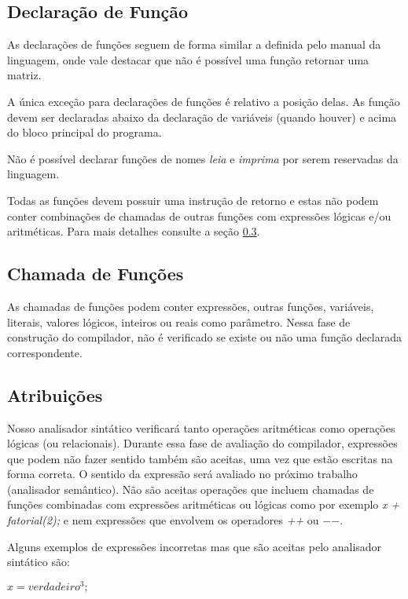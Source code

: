 \documentclass[
12pt,				%
a4paper,			%
english,			%
french,				%
spanish,			%
brazil,				%
article
]{abntex2}
\begin{document}
\subsection{Declaração de Função}
As declarações de funções seguem de forma similar a definida pelo manual da linguagem, onde vale destacar que não é possível uma função retornar uma matriz.

A única exceção para declarações de funções é relativo a posição delas. As função devem ser declaradas abaixo da declaração de variáveis (quando houver) e acima do bloco principal do programa.

Não é possível declarar funções de nomes \textit{leia} e \textit{imprima} por serem reservadas da linguagem.

Todas as funções devem possuir uma instrução de retorno e estas não podem conter combinações de chamadas de outras funções com expressões lógicas e/ou aritméticas. Para mais detalhes consulte a seção \ref{atribuicoes}.

\subsection{Chamada de Funções}
As chamadas de funções podem conter expressões, outras funções, variáveis, literais, valores lógicos, inteiros ou reais como parâmetro. Nessa fase de construção do compilador, não é verificado se existe ou não uma função declarada correspondente.

\subsection{Atribuições}
\label{atribuicoes}
Nosso analisador sintático verificará tanto operações aritméticas como operações lógicas (ou relacionais). Durante essa fase de avaliação do compilador, expressões que podem não fazer sentido também são aceitas, uma vez que estão escritas na forma correta. O sentido da expressão será avaliado no próximo trabalho (analisador semântico). Não são aceitas operações que incluem chamadas de funções combinadas com expressões aritméticas ou lógicas como por exemplo \textit{x + fatorial(2);} e nem expressões que envolvem os operadores \textit{++} ou \textit{$-$$-$}.

Alguns exemplos de expressões incorretas mas que são aceitas pelo analisador sintático são:


\begin{math}
	\mathit{x = verdadeiro ^ 3;}
\end{math}
\end{document}
